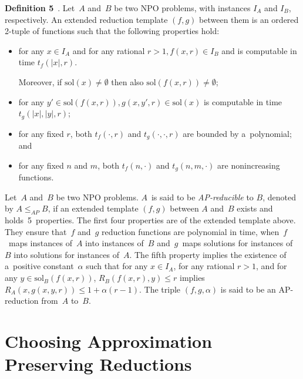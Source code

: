 \begin{multicols}{2}
\smallskip

\noindent
\textbf{Definition 5}~\cite{TrevisanLuca}.
Let~$A$ and~$B$ be two {NPO} problems, with
instances $I_{A}$ and $I_{B}$, respectively. An extended reduction
template $(f,g)$ between them is an ordered
2-tuple of functions such that the following properties hold:
\begin{itemize}
\item for any $x \in I_{A}$ and for any rational $r >
1,f(x,r)$\linebreak $\in I_{B}$ and is computable in time $t_{f}(|x|,r)$.

Moreover, if $\mathrm{sol}\left(x\right) \neq \emptyset$ then also $\mathrm{sol}\left(f(x,r)\right) \neq
\emptyset$;
\item for any $y' \in \mathrm{sol}\left(f(x,r)\right), g(x,y',r) \in \mathrm{sol}\left(x\right)$ is
computable in time $t_{g}(|x|,|y|,r)$;
\item for any fixed $r$, both $t_{f}(\cdot,r)$ and
$t_{g}(\cdot,\cdot,r)$ are bounded by a~polynomial; and
\item for any fixed $n$ and $m$, both $t_{f}(n,\cdot)$ and
$t_{g}(n,m,\cdot)$ are nonincreasing functions.
\end{itemize}

\smallskip

Let~$A$ and~$B$ be two {NPO} problems. $A$~is said to be
\textit{AP-reducible} to $B$, denoted by $A\leq_{AP}B$, if an
extended template $(f,g)$ between $A$ and~$B$ exists and
holds~5~properties. The first four properties are of the extended template
above. They ensure that~$f$ and~$g$ reduction functions are
polynomial in time, when~$f$~maps instances of~$A$ into instances of~$B$
and~$g$~maps solutions for instances of~$B$ into solutions for
instances of~$A$. The fifth property implies the existence of a~positive constant~$\alpha$ such that for any $x \in I_{A}$, for any
rational $r > 1$, and for any $y \in \mathrm{sol}_{B}(f(x,r))$,
$R_{B}(f(x,r),y) \leq r$ implies $R_{A}(x,g(x,y,r)) \leq 1 +
\alpha(r-1)$. The triple $(f,g,\alpha)$ is said to be an
AP-reduction from~$A$ to~$B$.

\section{Choosing Approximation Preserving Reductions}
\label{s:ChoosRed}


\end{multicols}

